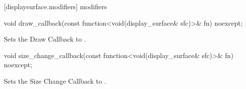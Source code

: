  [displaysurface.modifiers]{ modifiers}

\begin{itemdecl}
void draw_callback(const function<void(display_surface& sfc)>& fn) noexcept;
\end{itemdecl}
\begin{itemdescr}
\pnum
\effects
Sets the Draw Callback to .
\end{itemdescr}

\begin{itemdecl}
void size_change_callback(const function<void(display_surface& sfc)>& fn)
  noexcept;
\end{itemdecl}
\begin{itemdescr}
\pnum
\effects
Sets the Size Change Callback to .
\end{itemdescr}

